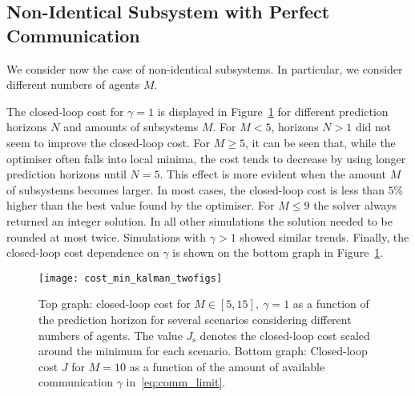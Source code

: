 \documentclass[letterpaper, 10 pt, conference]{ieeeconf}  %
\newcommand{\todo}[1]{
	\begin{center}
		\fcolorbox{wheat}{wheat}{\parbox[t]{0.9\linewidth}{\textbf{ToDo:} #1}}
	\end{center}}
\begin{document}

\subsection{Non-Identical Subsystem with Perfect Communication}

We consider now the case of non-identical subsystems. In particular, we consider different numbers of agents $M$. 

The closed-loop cost for $\gamma=1$ is displayed in Figure~\ref{fig:cl_cost_perfect_comm} for different prediction horizons $N$ and amounts of subsystems $M$. For $M<5$, horizons $N>1$ did not seem to improve the closed-loop cost. For $M\geq5$, it can be seen that, while the optimiser often falls into local minima, the cost tends to decrease by using longer prediction horizons until $N=5$. This effect is more evident when the amount $M$ of subsystems becomes larger. In most cases, the closed-loop cost is less than $5\%$ higher than the best value found by the optimiser. 
For $M\leq9$ the solver always returned an integer solution. In all other simulations the solution needed to be rounded at most twice. Simulations with $\gamma>1$ showed similar trends. Finally, the closed-loop cost dependence on $\gamma$ is shown on the bottom graph in Figure~\ref{fig:cl_cost_perfect_comm}.

\begin{figure}
	\begin{center}
		\texttt{[image: cost\_min\_kalman\_twofigs]}
		\caption{Top graph: closed-loop cost for $M\in[5,15], \ \gamma = 1$ as a function of the prediction horizon for several scenarios considering different numbers of agents. The value $J_\mathrm{s}$ denotes the closed-loop cost scaled around the minimum for each scenario.
		Bottom graph: Closed-loop cost $J$ for $M=10$ as a function of the amount of available communication $\gamma$ in~\eqref{eq:comm_limit}. }
		\label{fig:cl_cost_perfect_comm}
	\end{center}
\vspace{-1.5em}
\end{figure}

\end{document}
